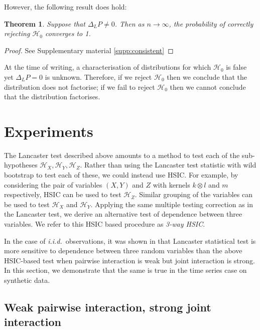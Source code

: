 \documentclass[]{article}
\newtheorem{theorem}{Theorem}
\begin{document}
However, the following result does hold:

\begin{theorem}\label{theorem:consistent}
Suppose that $\Delta_LP \not =0$. Then as $n\longrightarrow\infty$, the probability of correctly rejecting $\mathcal{H}_0$ converges to 1.
\end{theorem}
\begin{proof}
See Supplementary material \ref{supp:consistent}
\end{proof}

At the time of writing, a characterisation of distributions for which $\mathcal{H}_0$ is false yet $\Delta_LP=0$ is unknown. Therefore, if we reject $\mathcal{H}_0$ then we conclude that the distribution does not factorise; if we fail to reject $\mathcal{H}_0$ then we cannot conclude that the distribution factorises.


\section{Experiments}\label{section:experiments}

The Lancaster test described above amounts to a method to test each of the sub-hypotheses $\mathcal{H}_X, \mathcal{H}_Y, \mathcal{H}_Z$. Rather than using the Lancaster test statistic with wild bootstrap to test each of these, we could instead use HSIC. For example, by considering the pair of variables $(X,Y)$ and $Z$ with kernels $k\otimes l$ and $m$ respectively, HSIC can be used to test $\mathcal{H}_Z$. Similar grouping of the variables can be used to test $\mathcal{H}_X$ and $\mathcal{H}_Y$. Applying the same multiple testing correction as in the Lancaster test, we derive an alternative test of dependence between three variables. We refer to this HSIC based procedure as \emph{3-way HSIC}.

In the case of \emph{i.i.d.}~observations, it was shown in \citet{sejdinovic2013kernel} that Lancaster statistical test is more sensitive to dependence between three random variables than the above HSIC-based test when pairwise interaction is weak but joint interaction is strong. In this section, we demonstrate that the same is true in the time series case on synthetic data.




\subsection{Weak pairwise interaction, strong joint interaction}\label{experiment1}
\end{document}
